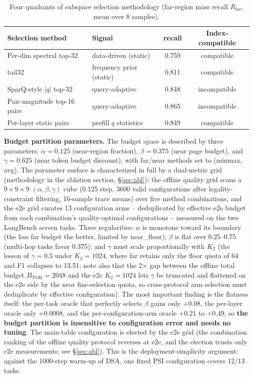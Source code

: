 \documentclass[11pt]{article}
\begin{document}
\begin{table}[h]\centering
\caption{Four quadrants of subspace selection methodology (far-region mass recall $R_{\mathrm{far}}$, mean over 8 samples).}
\label{tab:select}
\begin{tabular}{llcc}
\toprule
Selection method & Signal & recall & Index-compatible \\
\midrule
Per-dim spectral top-32 & data-driven (static) & 0.759 & compatible \\
tail32 & frequency prior (static) & 0.811 & compatible \\
SparQ-style $|q|$ top-32 & query-adaptive & 0.848 & incompatible \\
Pair-magnitude top-16 pairs & query-adaptive & 0.865 & incompatible \\
Per-layer static pairs & prefill $q$ statistics & 0.849 & compatible \\
\bottomrule
\end{tabular}
\end{table}

\textbf{Budget partition parameters.} The budget space is described by three parameters: $\alpha{=}0.125$ (near-region fraction), $\beta{=}0.375$ (near page budget), and $\gamma{=}0.625$ (near token budget discount), with far/near methods set to (minmax, avg). The parameter surface is characterized in full by a dual-metric grid (methodology in the ablation section, \S\ref{sec:abl}): the offline quality grid scans a $9\times9\times9$ $(\alpha,\beta,\gamma)$ cube (0.125 step, 3600 valid configurations after legality-constraint filtering, 16-sample trace means) over five method combinations, and the e2e grid curates 13 configuration arms -- deduplicated by effective e2e budget from each combination's quality-optimal configurations -- measured on the two LongBench screen tasks. Three regularities: $\alpha$ is monotone toward its boundary (the less far budget the better, limited by near\_floor); $\beta$ is flat over 0.25--0.75 (multi-hop tasks favor 0.375); and $\gamma$ must scale proportionally with $K_2$ (the lesson of $\gamma{=}0.5$ under $K_2{=}1024$, where far retains only the floor quota of 64 and F1 collapses to 13.51; note also that the 2$\times$ gap between the offline total budget $B_{\mathrm{TOK}}{=}2048$ and the e2e $K_2{=}1024$ lets $\gamma$ be truncated and flattened on the e2e side by the near fine-selection quota, so cross-protocol arm selection must deduplicate by effective configuration). The most important finding is the flatness itself: the per-task oracle that perfectly selects $\beta$ gains only +0.08, the per-layer oracle only +0.0008, and the per-configuration-arm oracle $+0.21$ to $+0.49$, so \textbf{the budget partition is insensitive to configuration error and needs no tuning}. The main-table configuration is elected by the e2e grid (the combination ranking of the offline quality protocol reverses at e2e, and the election trusts only e2e measurements; see \S\ref{sec:abl}). This is the deployment-simplicity argument: against the 1000-step warm-up of DSA, one fixed PSI configuration covers 12/13 tasks.
\end{document}
